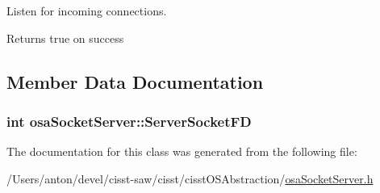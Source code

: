 Listen for incoming connections. 

\begin{DoxyReturn}{Returns}
true on success 
\end{DoxyReturn}


\subsection{Member Data Documentation}
\hypertarget{classosa_socket_server_ad540b1c7de4c8d402ea98c937a7d8832}{}
\subsubsection[{Server\+Socket\+F\+D}]{\setlength{\rightskip}{0pt plus 5cm}int osa\+Socket\+Server\+::\+Server\+Socket\+F\+D\hspace{0.3cm}{\ttfamily [protected]}}\label{classosa_socket_server_ad540b1c7de4c8d402ea98c937a7d8832}


The documentation for this class was generated from the following file\+:\begin{DoxyCompactItemize}
\item 
/\+Users/anton/devel/cisst-\/saw/cisst/cisst\+O\+S\+Abstraction/\hyperlink{osa_socket_server_8h}{osa\+Socket\+Server.\+h}\end{DoxyCompactItemize}
